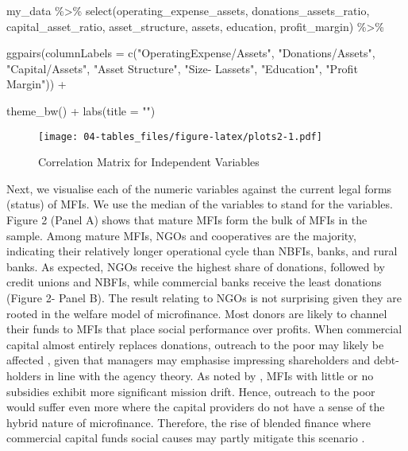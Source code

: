\documentclass[a4paper,nobind]{templates/ociamthesis}
\newenvironment{Shaded}{\begin{snugshade}}{\end{snugshade}}
\newcommand{\AttributeTok}[1]{\textcolor[rgb]{0.77,0.63,0.00}{#1}}
\newcommand{\FunctionTok}[1]{\textcolor[rgb]{0.00,0.00,0.00}{#1}}
\newcommand{\NormalTok}[1]{#1}
\newcommand{\SpecialCharTok}[1]{\textcolor[rgb]{0.00,0.00,0.00}{#1}}
\newcommand{\StringTok}[1]{\textcolor[rgb]{0.31,0.60,0.02}{#1}}
\renewenvironment{Shaded}
{
  \vspace{10pt}%
  \begin{snugshade}%
}{%
  \end{snugshade}%
  \vspace{8pt}%
}
\begin{document}
\newpage
\begin{landscape}

\begin{Shaded}
\begin{Highlighting}[]
\NormalTok{my\_data }\SpecialCharTok{\%\textgreater{}\%} \FunctionTok{select}\NormalTok{(operating\_expense\_assets, }
\NormalTok{          donations\_assets\_ratio, }
\NormalTok{          capital\_asset\_ratio,}
\NormalTok{          asset\_structure, assets, }
\NormalTok{          education, profit\_margin) }\SpecialCharTok{\%\textgreater{}\%} 
  
  \FunctionTok{ggpairs}\NormalTok{(}\AttributeTok{columnLabels =} \FunctionTok{c}\NormalTok{(}\StringTok{"OperatingExpense/Assets"}\NormalTok{,}
                          \StringTok{"Donations/Assets"}\NormalTok{, }\StringTok{"Capital/Assets"}\NormalTok{, }
                          \StringTok{"Asset Structure"}\NormalTok{, }\StringTok{"Size{-} Lassets"}\NormalTok{, }\StringTok{"Education"}\NormalTok{, }
                          \StringTok{"Profit Margin"}\NormalTok{)) }\SpecialCharTok{+} 
  
  \FunctionTok{theme\_bw}\NormalTok{() }\SpecialCharTok{+} \FunctionTok{labs}\NormalTok{(}\AttributeTok{title =} \StringTok{""}\NormalTok{)}
\end{Highlighting}
\end{Shaded}

\begin{figure}
\centering
\texttt{[image: 04-tables\_files/figure-latex/plots2-1.pdf]}
\caption{\label{fig:plots2}Correlation Matrix for Independent Variables}
\end{figure}

\end{landscape}

Next, we visualise each of the numeric variables against the current legal forms (status) of MFIs. We use the median of the variables to stand for the variables. Figure 2 (Panel A) shows that mature MFIs form the bulk of MFIs in the sample. Among mature MFIs, NGOs and cooperatives are the majority, indicating their relatively longer operational cycle than NBFIs, banks, and rural banks. As expected, NGOs receive the highest share of donations, followed by credit unions and NBFIs, while commercial banks receive the least donations (Figure 2- Panel B). The result relating to NGOs is not surprising given they are rooted in the welfare model of microfinance. Most donors are likely to channel their funds to MFIs that place social performance over profits. When commercial capital almost entirely replaces donations, outreach to the poor may likely be affected \autocite{roberts2013profit}, given that managers may emphasise impressing shareholders and debt-holders in line with the agency theory. As noted by \textcite{d2013unsubsidized}, MFIs with little or no subsidies exhibit more significant mission drift. Hence, outreach to the poor would suffer even more where the capital providers do not have a sense of the hybrid nature of microfinance. Therefore, the rise of blended finance where commercial capital funds social causes may partly mitigate this scenario \autocite{attridge2019blended}.
\end{document}
